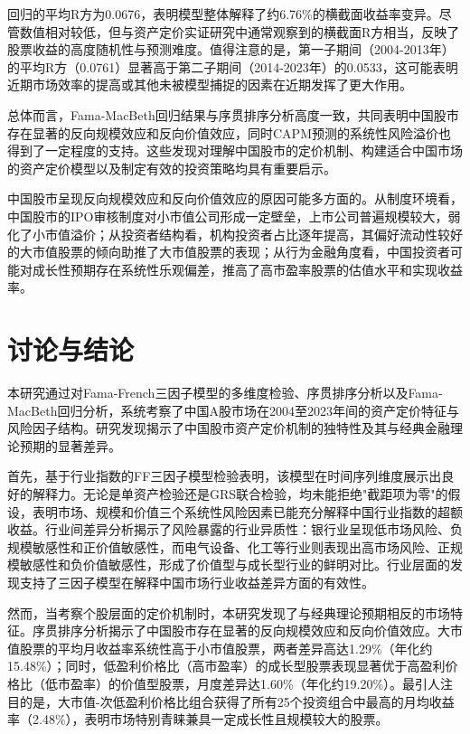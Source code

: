 \documentclass[12pt, a4paper]{article}
\begin{document}
回归的平均R方为0.0676，表明模型整体解释了约6.76\%的横截面收益率变异。尽管数值相对较低，但与资产定价实证研究中通常观察到的横截面R方相当，反映了股票收益的高度随机性与预测难度。值得注意的是，第一子期间（2004-2013年）的平均R方（0.0761）显著高于第二子期间（2014-2023年）的0.0533，这可能表明近期市场效率的提高或其他未被模型捕捉的因素在近期发挥了更大作用。

总体而言，Fama-MacBeth回归结果与序贯排序分析高度一致，共同表明中国股市存在显著的反向规模效应和反向价值效应，同时CAPM预测的系统性风险溢价也得到了一定程度的支持。这些发现对理解中国股市的定价机制、构建适合中国市场的资产定价模型以及制定有效的投资策略均具有重要启示。

中国股市呈现反向规模效应和反向价值效应的原因可能多方面的。从制度环境看，中国股市的IPO审核制度对小市值公司形成一定壁垒，上市公司普遍规模较大，弱化了小市值溢价；从投资者结构看，机构投资者占比逐年提高，其偏好流动性较好的大市值股票的倾向助推了大市值股票的表现；从行为金融角度看，中国投资者可能对成长性预期存在系统性乐观偏差，推高了高市盈率股票的估值水平和实现收益率。

\section{讨论与结论}

本研究通过对Fama-French三因子模型的多维度检验、序贯排序分析以及Fama-MacBeth回归分析，系统考察了中国A股市场在2004至2023年间的资产定价特征与风险因子结构。研究发现揭示了中国股市资产定价机制的独特性及其与经典金融理论预期的显著差异。

首先，基于行业指数的FF三因子模型检验表明，该模型在时间序列维度展示出良好的解释力。无论是单资产检验还是GRS联合检验，均未能拒绝"截距项为零"的假设，表明市场、规模和价值三个系统性风险因素已能充分解释中国行业指数的超额收益。行业间差异分析揭示了风险暴露的行业异质性：银行业呈现低市场风险、负规模敏感性和正价值敏感性，而电气设备、化工等行业则表现出高市场风险、正规模敏感性和负价值敏感性，形成了价值型与成长型行业的鲜明对比。行业层面的发现支持了三因子模型在解释中国市场行业收益差异方面的有效性。

然而，当考察个股层面的定价机制时，本研究发现了与经典理论预期相反的市场特征。序贯排序分析揭示了中国股市存在显著的反向规模效应和反向价值效应。大市值股票的平均月收益率系统性高于小市值股票，两者差异高达1.29\%（年化约15.48\%）；同时，低盈利价格比（高市盈率）的成长型股票表现显著优于高盈利价格比（低市盈率）的价值型股票，月度差异达1.60\%（年化约19.20\%）。最引人注目的是，大市值-次低盈利价格比组合获得了所有25个投资组合中最高的月均收益率（2.48\%），表明市场特别青睐兼具一定成长性且规模较大的股票。
\end{document}
